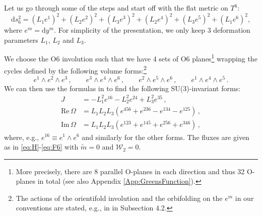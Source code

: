 \documentclass[11pt]{article}
\newcommand{\be}{\begin{equation}}
\newcommand{\ee}{\end{equation}}
\def\be{\begin{equation}}
\def\ee{\end{equation}}
\renewcommand{\[}{\left[}
\renewcommand{\]}{\right]}
\renewcommand{\(}{\left(}
\renewcommand{\)}{\right)}
\renewcommand{\Im}{\text{Im}\,}
\renewcommand{\Re}{\text{Re}\,}
\newcommand{\dd}{\mathrm{d}}
\newcommand{\<}{\langle}
\renewcommand{\>}{\rangle}
\begin{document}
Let us go through some of the steps and start off with the flat metric on $T^6$:
\be
	\dd s_6^2 = (L_1e^1)^2 + (L_2 e^2)^2 + (L_3 e^3)^2 + (L_2 e^4)^2 + (L_3 e^5)^2 + ( L_1 e^6)^2,
\ee
where $e^m =\dd y^m$.  For simplicity of the presentation, we only keep 3 deformation parameters $L_1$, $L_2$ and $L_3$. 

We choose the O6 involution such that we have 4 sets of O6 planes\footnote{More precisely, there are 8 parallel O-planes in each direction and thus 32 O-planes in total (see also Appendix \ref{App:GreensFunction}).} wrapping the cycles defined by the following volume forms:\footnote{The actions of the orientifold involution and the orbifolding on the $e^m$ in our conventions are stated, e.g., in \cite{Danielsson:2011au} in Subsection 4.2.}
\be
\label{eq:O6volumeforms}
e^1 \wedge e^2 \wedge e^3 \,,\qquad e^3 \wedge e^4 \wedge e^6\,,\qquad e^2 \wedge e^5 \wedge e^6\,,\qquad e^1 \wedge e^4 \wedge e^5 \,.
\ee
We can then use the formulas in \cite{Danielsson:2011au} to find the following SU(3)-invariant forms:
\begin{align}
	J &= -L_1^2 e^{16} - L_2^2 e^{24} + L_3^2 e^{35}\,,\\
	\Re \Omega &=  L_1 L_2 L_3 \left( e^{456} + e^{236} - e^{134} - e^{125}\right)\,,\\
	\Im \Omega &=   L_1 L_2 L_3 \left(e^{123} + e^{145} + e^{256} + e^{346} \right)\,,
\end{align}
where, e.g., $e^{16}\equiv e^1 \wedge e^6$ and similarly for the other forms.
The fluxes are given as in \eqref{eq:H}-\eqref{eq:F6} with $\tilde{m} = 0$ and $\mathcal{W}_2=0$.
\end{document}
